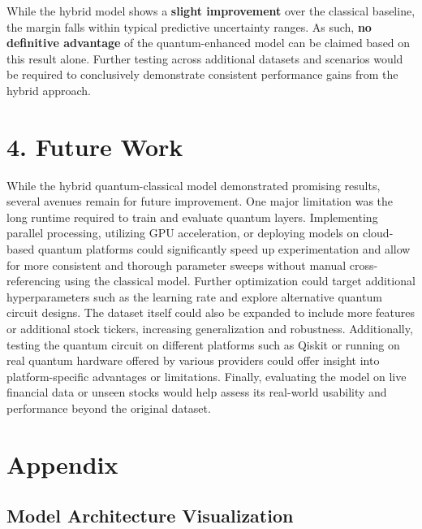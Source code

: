 \documentclass[10pt]{article}
\begin{document}
While the hybrid model shows a \textbf{slight improvement} over the classical baseline, the margin falls within typical predictive uncertainty ranges. As such, \textbf{no definitive advantage} of the quantum-enhanced model can be claimed based on this result alone. Further testing across additional datasets and scenarios would be required to conclusively demonstrate consistent performance gains from the hybrid approach.


\section*{4. Future Work}

While the hybrid quantum-classical model demonstrated promising results, several avenues remain for future improvement. One major limitation was the long runtime required to train and evaluate quantum layers. Implementing parallel processing, utilizing GPU acceleration, or deploying models on cloud-based quantum platforms could significantly speed up experimentation and allow for more consistent and thorough parameter sweeps without manual cross-referencing using the classical model. Further optimization could target additional hyperparameters such as the learning rate and explore alternative quantum circuit designs. The dataset itself could also be expanded to include more features or additional stock tickers, increasing generalization and robustness. Additionally, testing the quantum circuit on different platforms such as Qiskit or running on real quantum hardware offered by various providers could offer insight into platform-specific advantages or limitations. Finally, evaluating the model on live financial data or unseen stocks would help assess its real-world usability and performance beyond the original dataset.

\newpage
\appendix
\section{Appendix}
\subsection{Model Architecture Visualization}
\label{appendix:model-architecture}
\end{document}
